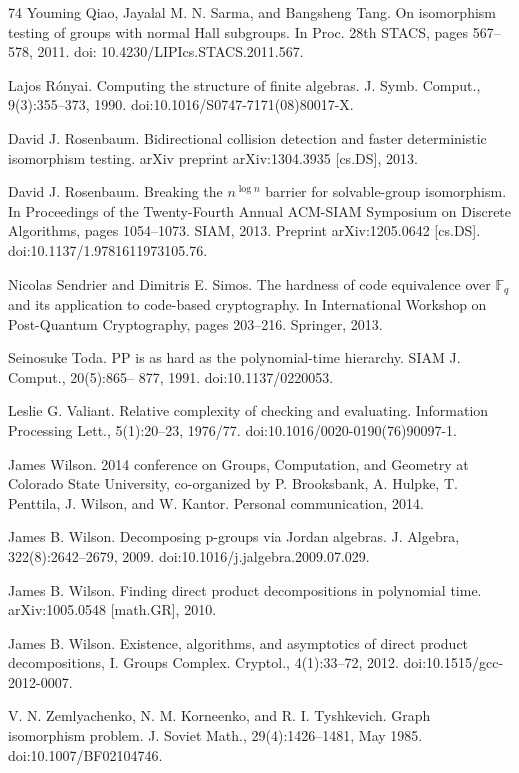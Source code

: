 \documentclass[10pt,a4paper]{article}
\begin{document}
\begin{thebibliography}{74}
Youming Qiao, Jayalal M. N. Sarma, and Bangsheng Tang. On isomorphism testing of groups with normal Hall subgroups. In Proc. 28th STACS, pages 567–578, 2011. doi: 10.4230/LIPIcs.STACS.2011.567.

Lajos Rónyai. Computing the structure of finite algebras. J. Symb. Comput., 9(3):355–373, 1990. doi:10.1016/S0747-7171(08)80017-X.

David J. Rosenbaum. Bidirectional collision detection and faster deterministic isomorphism testing. arXiv preprint arXiv:1304.3935 [cs.DS], 2013.

David J. Rosenbaum. Breaking the $n^{\log n}$ barrier for solvable-group isomorphism. In Proceedings of the Twenty-Fourth Annual ACM-SIAM Symposium on Discrete Algorithms, pages 1054–1073. SIAM, 2013. Preprint arXiv:1205.0642 [cs.DS]. doi:10.1137/1.9781611973105.76.

Nicolas Sendrier and Dimitris E. Simos. The hardness of code equivalence over $\mathbb F_q$ and its application to code-based cryptography. In International Workshop on Post-Quantum Cryptography, pages 203–216. Springer, 2013.

Seinosuke Toda. PP is as hard as the polynomial-time hierarchy. SIAM J. Comput., 20(5):865– 877, 1991. doi:10.1137/0220053.

Leslie G. Valiant. Relative complexity of checking and evaluating. Information Processing Lett., 5(1):20–23, 1976/77. doi:10.1016/0020-0190(76)90097-1.

James Wilson. 2014 conference on Groups, Computation, and Geometry at Colorado State University, co-organized by P. Brooksbank, A. Hulpke, T. Penttila, J. Wilson, and W. Kantor. Personal communication, 2014.

James B. Wilson. Decomposing p-groups via Jordan algebras. J. Algebra, 322(8):2642–2679, 2009. doi:10.1016/j.jalgebra.2009.07.029.

James B. Wilson. Finding direct product decompositions in polynomial time. arXiv:1005.0548 [math.GR], 2010.

James B. Wilson. Existence, algorithms, and asymptotics of direct product decompositions, I. Groups Complex. Cryptol., 4(1):33–72, 2012. doi:10.1515/gcc-2012-0007.

V. N. Zemlyachenko, N. M. Korneenko, and R. I. Tyshkevich. Graph isomorphism problem. J. Soviet Math., 29(4):1426–1481, May 1985. doi:10.1007/BF02104746.
\end{thebibliography}
\end{document}
